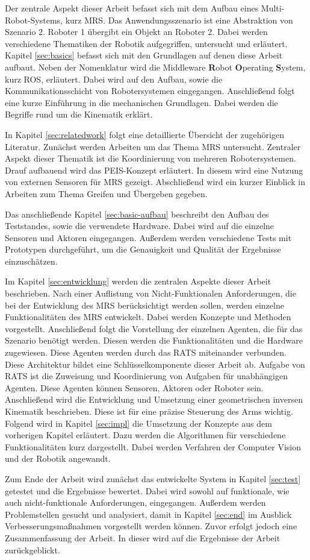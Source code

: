 Der zentrale Aspekt dieser Arbeit befasst sich mit dem Aufbau eines Multi-Robot-Systems, kurz MRS. Das Anwendungsszenario ist eine Abstraktion von Szenario 2. Roboter 1 übergibt ein Objekt an Roboter 2. Dabei werden verschiedene Thematiken der Robotik aufgegriffen, untersucht und erläutert. Kapitel \ref{sec:basics} befasst sich mit den Grundlagen auf denen diese Arbeit aufbaut. Neben der Nomenklatur wird die Middleware \textbf{R}obot \textbf{O}perating \textbf{S}ystem, kurz ROS, erläutert. Dabei wird auf den Aufbau, sowie die Kommunikationsschicht von Robotersystemen eingegangen. Anschließend folgt eine kurze Einführung in die mechanischen Grundlagen. Dabei werden die Begriffe rund um die Kinematik erklärt. 

In Kapitel \ref{sec:relatedwork} folgt eine detaillierte Übersicht der zugehörigen Literatur. Zunächst werden Arbeiten um das Thema MRS untersucht. Zentraler Aspekt dieser Thematik ist die Koordinierung von mehreren Robotersystemen. Drauf aufbauend wird das PEIS-Konzept erläutert. In diesem wird eine Nutzung von externen Sensoren für MRS gezeigt. Abschließend wird ein kurzer Einblick in Arbeiten zum Thema Greifen und Übergeben gegeben.

Das anschließende Kapitel \ref{sec:basic-aufbau} beschreibt den Aufbau des Teststandes, sowie die verwendete Hardware. Dabei wird auf die einzelne Sensoren und Aktoren eingegangen. Außerdem werden verschiedene Tests mit Prototypen durchgeführt, um die Genauigkeit und Qualität der Ergebnisse einzuschätzen.

Im Kapitel \ref{sec:entwicklung} werden die zentralen Aspekte dieser Arbeit beschrieben. Nach einer Auflistung von Nicht-Funktionalen Anforderungen, die bei der Entwicklung des MRS berücksichtigt werden sollen, werden einzelne Funktionalitäten des MRS entwickelt. Dabei werden Konzepte und Methoden vorgestellt. Anschließend folgt die Vorstellung der einzelnen Agenten, die für das Szenario benötigt werden. Diesen werden die Funktionalitäten und die Hardware zugewiesen. Diese Agenten werden durch das RATS miteinander verbunden. Diese Architektur bildet eine Schlüsselkomponente dieser Arbeit ab. Aufgabe von RATS ist die Zuweisung und Koordinierung von Aufgaben für unabhängigen Agenten. Diese Agenten können Sensoren, Aktoren oder Roboter sein. Anschließend wird die Entwicklung und Umsetzung einer geometrischen inversen Kinematik beschrieben. Diese ist für eine präzise Steuerung des Arms wichtig. Folgend wird in Kapitel \ref{sec:impl} die Umsetzung der Konzepte aus dem vorherigen Kapitel erläutert. Dazu werden die Algorithmen für verschiedene Funktionalitäten kurz dargestellt. Dabei werden Verfahren der Computer Vision und der Robotik angewandt. 

Zum Ende der Arbeit wird zunächst das entwickelte System in Kapitel \ref{sec:test} getestet und die Ergebnisse bewertet. Dabei wird sowohl auf funktionale, wie auch nicht-funktionale Anforderungen, eingegangen. Außerdem werden Problemstellen gesucht und analysiert, damit in Kapitel \ref{sec:end} im Ausblick Verbesserungsmaßnahmen vorgestellt werden können. Zuvor erfolgt jedoch eine Zusammenfassung der Arbeit. In dieser wird auf die Ergebnisse der Arbeit zurückgeblickt.



